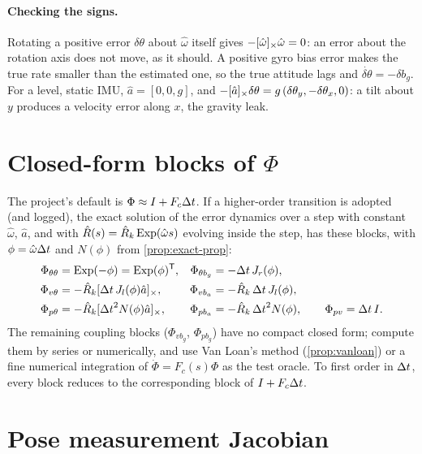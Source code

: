 \paragraph{Checking the signs.} Rotating a positive error $\delta\theta$ about $\hat\omega$ itself gives $-[\hat\omega]_{\times}\hat\omega = 0$: an error about the rotation axis
does not move, as it should. A positive gyro bias error makes the true rate smaller than the estimated one, so the true attitude
lags and $\dot{\delta\theta} = -\delta b_g$. For a level, static IMU, $\hat a = [0, 0, g]$, and $-[\hat a]_{\times}\delta\theta = g\,(\delta\theta_y, -\delta\theta_x, 0)$: a tilt about $y$
produces a velocity error along $x$, the gravity leak.

\section{Closed-form blocks of \texorpdfstring{$\Phi$}{Phi}}
\label{sol:Phi}

The project's default is $\Phi \approx I + F_c{\Delta t}$. If a higher-order transition is adopted (and logged), the exact solution of the error
dynamics over a step with constant $\hat\omega$, $\hat a$, and with $\hat R(s) = \hat R_k\operatorname{Exp}(\hat\omega s)$ evolving inside the step, has these blocks,
with $\phi = \hat\omega{\Delta t}$ and $N(\phi)$ from \cref{prop:exact-prop}:
\begin{align*}
  \Phi_{\theta\theta} &= \operatorname{Exp}(-\phi) = \operatorname{Exp}(\phi)^{\mathsf{T}}, & \Phi_{\theta b_g} &= -{\Delta t}\,J_r(\phi), \\
  \Phi_{v\theta} &= -\hat R_k[{\Delta t}\,J_l(\phi)\hat a]_{\times}, & \Phi_{vb_a} &= -\hat R_k\,{\Delta t}\,J_l(\phi), \\
  \Phi_{p\theta} &= -\hat R_k[{\Delta t}^2N(\phi)\hat a]_{\times}, & \Phi_{pb_a} &= -\hat R_k\,{\Delta t}^2N(\phi), \qquad \Phi_{pv} = {\Delta t}\,I .
\end{align*}
The remaining coupling blocks ($\Phi_{vb_g}$, $\Phi_{pb_g}$) have no compact closed form; compute them by series or numerically, and use
Van Loan's method (\cref{prop:vanloan}) or a fine numerical integration of $\dot\Phi = F_c(s)\Phi$ as the test oracle. To first order in
${\Delta t}$, every block reduces to the corresponding block of $I + F_c{\Delta t}$.

\section{Pose measurement Jacobian}
\label{sol:Hpose}

